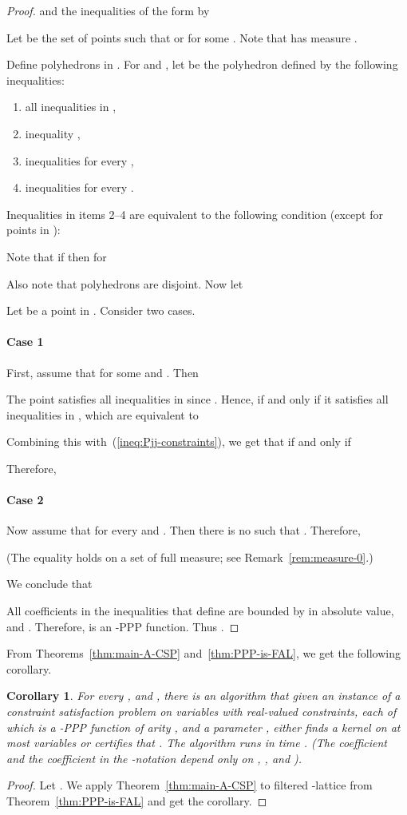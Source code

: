 \documentclass[11pt]{article}
\newtheorem{corollary}[theorem]{Corollary}
\begin{document}
\begin{proof}
and the inequalities of the form  by


Let  be the set of points  such that
 or 
for some . Note that  has measure .

Define  polyhedrons  in . For  and , let  be the
polyhedron defined by the following inequalities:
\begin{enumerate}
\item all inequalities in ,
\item inequality ,
\item inequalities  for every ,
\item inequalities  for every .
\end{enumerate}
Inequalities in items 2--4 are equivalent to the following condition (except for points in ):


Note that if  then  for

Also note that polyhedrons  are disjoint.
Now let


Let  be a point in . Consider two cases.
\medskip

\paragraph{Case 1} First, assume that  for some  and . Then

The point  satisfies all inequalities in  since .
Hence,  if and only if it satisfies all inequalities in , which are equivalent to

Combining this with~(\ref{ineq:Pjj-constraints}), we get that  if and only if

Therefore,


\paragraph{Case 2} Now assume that  for every  and .  Then there is no  such that . Therefore,

(The equality holds on a set of full measure; see Remark~\ref{rem:measure-0}.)

We conclude that

All coefficients in the inequalities that define  are bounded by  in absolute value, and
. Therefore,
 is an -PPP function. Thus .
\end{proof}

From Theorems~\ref{thm:main-A-CSP} and~\ref{thm:PPP-is-FAL}, we get the following corollary.
\begin{corollary}
For every ,  and , there is an algorithm that given an instance of a constraint satisfaction problem on  variables 
with  real-valued constraints, each of which is a -PPP function of arity , and a parameter ,
either finds a kernel on at most  variables or certifies that .
The algorithm runs in time . (The coefficient  and the coefficient in the -notation depend only on , , and ).
\end{corollary}
\begin{proof}
Let .
We apply Theorem~\ref{thm:main-A-CSP} to filtered -lattice  from Theorem~\ref{thm:PPP-is-FAL} and get the corollary.
\end{proof}
\end{document}
